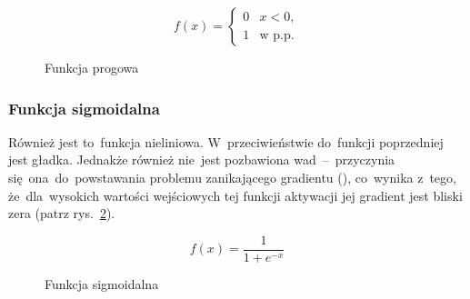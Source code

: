\begin{minipage}[t]{\textwidth}
\begin{equation}
	f(x) =
	\begin{cases}
	0 & x<0, \\
	1 & \textrm{w p.p.}
	\end{cases}
\end{equation}

\begin{figure}[H]
    \centering
    \caption{Funkcja progowa}
    \label{rys:f.progowa}
\end{figure}
\end{minipage}

\subsubsection{Funkcja sigmoidalna} \label{sssec:sigmoid}
Również jest to~funkcja nieliniowa. W~przeciwieństwie do~funkcji poprzedniej jest gładka. Jednakże również nie~jest
pozbawiona wad~--~przyczynia się~ona~do~powstawania problemu zanikającego gradientu (\cite{vanishing-gradient}),
co~wynika z~tego, że~dla~wysokich wartości wejściowych tej funkcji aktywacji jej gradient jest bliski zera (patrz
rys.~\ref{rys:f.sigmoidalna}).

\begin{minipage}[t]{\textwidth}
\begin{equation}
	f(x) = \frac{1}{1+e^{-x}}
\end{equation}

\begin{figure}[H]
    \centering
    \caption{Funkcja sigmoidalna}
    \label{rys:f.sigmoidalna}
\end{figure}
\end{minipage}

